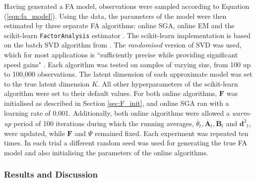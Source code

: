 \documentclass[msc,deptreport.inf]{infthesis} %
\newcommand{\matr}[1]{\mathbf{#1}}
\begin{document}
Having generated a FA model, observations were sampled according to Equation (\ref{eqn:fa_model}). Using the data, the parameters of the model were then estimated by three separate FA algorithms: online SGA, online EM and the scikit-learn \texttt{FactorAnalysis} estimator \cite{pedregosa2012}. The scikit-learn implementation is based on the batch SVD algorithm from \cite{barber2007}. The \emph{randomised} version of SVD was used, which for most applications is  ``sufficiently precise while providing significant speed gains" \cite{pedregosa2012}. Each algorithm was tested on samples of varying size, from 100 up to 100,000 observations. The latent dimension of each approximate model was set to the true latent dimension $K$. All other hyperparameters of the scikit-learn algorithm were set to their default values. For both online algorithms, $\matr{F}$ was initialised as described in Section \ref{sec:F_init}, and online SGA ran with a learning rate of 0.001. Additionally, both online algorithms were allowed a \emph{warm-up} period of 100 iterations during which the running averages, $\overline{\theta}_t, \overline{\matr{A}}_t, \overline{\matr{B}}_t$ and $\overline{\matr{d}^2}_t$, were updated, while $\matr{F}$ and $\Psi$ remained fixed. Each experiment was repeated ten times. In each trial a different random seed was used for generating the true FA model and also initialising the parameters of the online algorithms. 


\subsubsection{Results and Discussion}
\end{document}
